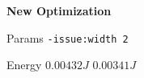 
        \begin{tcolorbox}[width=\linewidth, colback=white!95!black, colframe=white!95!black]
            \begin{center}\textbf{New Optimization}\end{center}

            \tcblower
            
            Params \hfill \verb|-issue:width 2|

            Energy \hfill \st{$0.00432J$} $0.00341J$

        \end{tcolorbox}
    